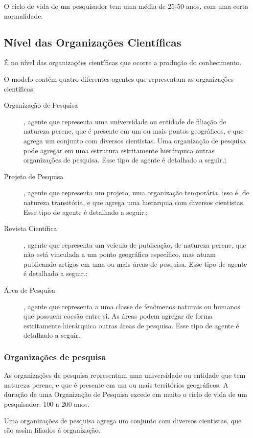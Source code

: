 O ciclo de vida de um pesquisador tem uma média de 25-50 anos, com uma certa normalidade.

\subsection{Nível das Organizações Científicas}

É no nível das organizações científicas que ocorre a produção do conhecimento.

O modelo contém quatro diferentes agentes que representam as organizações científicas:
\begin{description}
    \item [Organização de Pesquisa], agente que representa uma universidade ou entidade de filiação de natureza perene, que é presente em um ou mais pontos geográficos, e que agrega um conjunto com diversos cientistas. Uma organização de pesquisa pode agregar em uma estrutura estritamente hierárquica outras organizações de pesquisa. Esse tipo de agente é detalhado a seguir.;
    \item [Projeto de Pesquisa], agente que representa um projeto, uma organização temporária, isso é, de natureza transitória, e que agrega uma hierarquia com diversos cientistas. Esse tipo de agente é detalhado a seguir.;
    \item [Revista Científica], agente que representa um veículo de publicação, de natureza perene, que não está vinculada a um ponto geográfico específico, mas atuam publicando artigos em uma ou mais áreas de pesquisa. Esse tipo de agente é detalhado a seguir.;
    \item [Área de Pesquisa], agente que representa a uma classe de fenômenos naturais ou humanos que possuem coesão entre si. As áreas podem agregar de forma estritamente hierárquica outras áreas de pesquisa. Esse tipo de agente é detalhado a seguir.
\end{description}

\subsubsection{Organizações de pesquisa}
As organizações de pesquisa representam uma universidade ou entidade que tem natureza perene, e que é presente em um ou mais territórios geográficos. A duração de uma Organização de Pesquisa excede em muito o ciclo de vida de um pesquisador: 100 a 200 anos.

Uma organizações de pesquisa agrega um conjunto com diversos cientistas, que são assim filiados à organização. 

